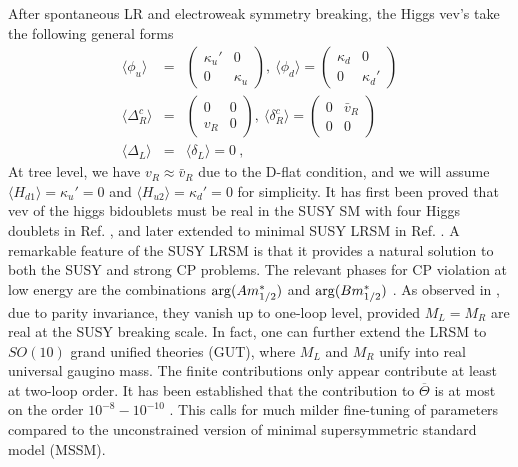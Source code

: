 \documentclass[prd,aps,preprint,tightenlines,superscriptaddress]{revtex4}
\begin{document}
After spontaneous LR and electroweak symmetry breaking, the Higgs vev's take the following general forms
\begin{eqnarray}\label{define}
\langle \phi_u \rangle &=& \left( \begin{array}{cc} \kappa_u' & 0\\
0 & \kappa_u  \end{array} \right), \  \langle \phi_d \rangle = \left( \begin{array}{cc} \kappa_d  & 0 \\
0 & \kappa_d' \end{array} \right) \nonumber \\
\langle \Delta_R^c \rangle &=& \left( \begin{array}{cc} 0 & 0 \\
v_R &  0 \end{array} \right), \
\langle \delta_R^c \rangle = \left( \begin{array}{cc} 0 & \bar v_R \\
0 &  0 \end{array} \right) \nonumber \\
\langle \Delta_L \rangle &=& \langle \delta_L \rangle =0 \ ,
\end{eqnarray}
At tree level, we have $v_R \approx \bar v_R$ due to the D-flat condition, and we will assume $\langle H_{d1} \rangle = \kappa_u' = 0$ and $\langle H_{u2} \rangle = \kappa_d' = 0$ for simplicity.
It has first been proved that vev of the higgs bidoublets must be real in the SUSY SM with four Higgs doublets in Ref. \cite{Masip:1995sm}, and later extended to minimal SUSY LRSM in Ref. \cite{susylr}.
A remarkable feature of the SUSY LRSM is that it provides a natural
solution to both the SUSY and strong CP problems. The relevant phases for CP violation at low energy are the combinations ${\rm arg} (A m_{1/2}^*)$ and
${\rm arg} (B m_{1/2}^*)$ \cite{Dugan:1984qf}. As observed in \cite{susylr, Babu:2001se}, due to parity invariance, they vanish up to one-loop level, provided $M_L =
M_R$ are real at the SUSY breaking scale. In fact, one can further extend the LRSM to $SO(10)$ grand unified theories (GUT), where $M_L$ and $M_R$ unify into real universal gaugino mass. The finite contributions only appear contribute at least at two-loop order. It has been established that the contribution to $\overline \Theta$ is at most on the order $10^{-8}-10^{-10}$ \cite{Babu:2001se}. This calls for much milder fine-tuning of parameters compared to the unconstrained version of minimal supersymmetric standard model (MSSM).
\end{document}
